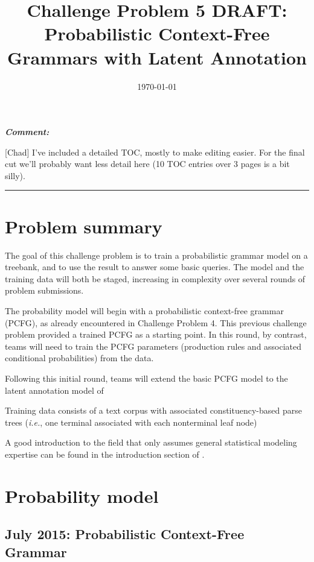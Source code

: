 \documentclass[english]{article}
\renewenvironment{comment}
    {%
     \par\medskip\noindent
     \tabularx{\textwidth}{|>{\columncolor[gray]{0.9}}X|}
     \hline
     \emph{\textbf{Comment:}}%
    }
    {%
     \endtabularx\hrule\par\medskip
    }
\begin{document}
\title{Challenge Problem 5 DRAFT:\\
Probabilistic Context-Free Grammars with Latent Annotation}

\date{\today}

\maketitle
\tableofcontents{}

\begin{comment}
[Chad] I've included a detailed TOC, mostly to make editing easier. For the final cut we'll probably want less detail here (10 TOC entries over 3 pages is a bit silly).
\end{comment}

\section{Problem summary}

The goal of this challenge problem is to train a probabilistic grammar model on a treebank, and to use the result to answer some basic queries. The model and the training data will both be staged, increasing in complexity over several rounds of problem submissions.

The probability model will begin with a probabilistic context-free grammar (PCFG), as already encountered in Challenge Problem 4. This previous challenge problem provided a trained PCFG as a starting point. In this round, by contrast, teams will need to train the PCFG parameters (production rules and associated conditional probabilities) from the data. 

Following this initial round, teams will extend the basic PCFG model to the latent annotation model of \citet{Matsuzaki2005}

Training data consists of a text corpus with associated constituency-based parse trees (\emph{i.e.}, one terminal associated with each nonterminal leaf node)

A good introduction to the field that only assumes general statistical modeling expertise can be found in the introduction section of \citet{Liang2009}.


\section{Probability model}

\subsection{July 2015: Probabilistic Context-Free Grammar}
\end{document}
